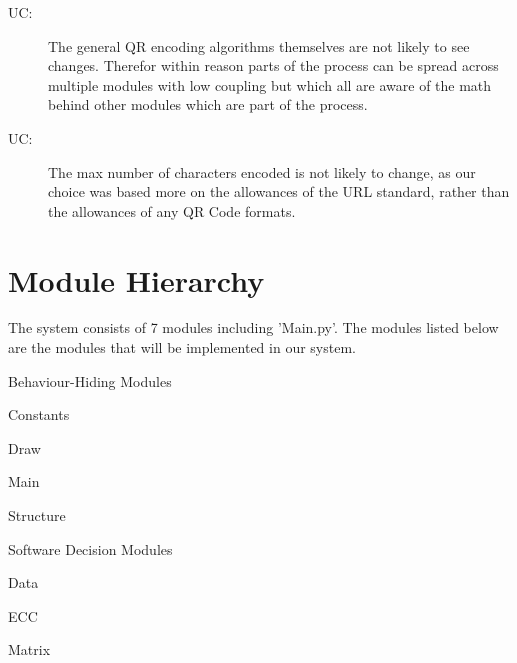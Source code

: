 \documentclass[12pt, titlepage]{article}
\newcounter{ucnum}
\newcommand{\uctheucnum}{UC\theucnum}
\newcounter{mnum}
\newcommand{\mthemnum}{M\themnum}
\begin{document}
\begin{description}
\item[ \uctheucnum \label{ucAlgorithms}:] 
The general QR encoding algorithms themselves are not likely to see changes. Therefor within reason parts of the process can be spread across multiple modules with low coupling but which all are aware of the math behind other modules which are part of the process.

\item[ \uctheucnum \label{ucInput}:] 
The max number of characters encoded is not likely to change, as our choice was based more on the allowances of the URL standard, rather than the allowances of any QR Code formats.

\end{description}

\section{Module Hierarchy} \label{SecMH}

The system consists of 7 modules including 'Main.py'. The modules listed below are the modules that will be implemented in our system.
\begin{description}

 \item [ \mthemnum \label{mHH}:] Behaviour-Hiding Modules

 \item Constants
 \item Draw 
 \item Main 
 \item Structure 
 \item [\refstepcounter{mnum} \mthemnum \label{mHH}:] Software Decision Modules
 \item Data 
 \item ECC
 \item Matrix
\end{description}
\end{document}

